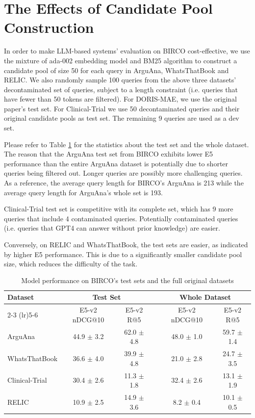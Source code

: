 \documentclass[11pt]{article}
\begin{document}
\section{The Effects of Candidate Pool Construction}
\label{sec: appendix_the effects of candidate pool construction}
In order to make LLM-based systems' evaluation on BIRCO cost-effective, we use the mixture of ada-002 embedding model and BM25 algorithm to construct a candidate pool of size 50 for each query in ArguAna, WhatsThatBook and RELIC. We also randomly sample 100 queries from the above three datasets' decontaminated set of queries, subject to a length constraint (i.e. queries that have fewer than 50 tokens are filtered). For DORIS-MAE, we use the original paper's test set. For Clinical-Trial we use 50 decontaminated queries and their original candidate pools as test set. The remaining 9 queries are used as a dev set.

Please refer to Table \ref{tab: test_set_whole_set_comparison} for the statistics about the test set and the whole dataset. The reason that the ArguAna test set from BIRCO exhibits lower E5 performance than the entire ArguAna dataset is potentially due to shorter queries being filtered out. Longer queries are possibly more challenging queries. As a reference, the average query length for BIRCO's ArguAna is 213 while the average query length for ArguAna's whole set is 193. 

Clinical-Trial test set is competitive with its complete set, which has 9 more queries that include 4 contaminated queries. Potentially contaminated queries (i.e. queries that GPT4 can answer without prior knowledge) are easier.

Conversely, on RELIC and WhatsThatBook, the test sets are easier, as indicated by higher E5 performance. This is due to a significantly smaller candidate pool size, which reduces the difficulty of the task. 



\begin{table}[ht]
\centering
\footnotesize
\setlength{\tabcolsep}{3pt}
\begin{tabular}{@{}lccccc@{}}
\toprule
Dataset & \multicolumn{2}{c}{Test Set} & \phantom{abc} & \multicolumn{2}{c}{Whole Dataset} \\
\cmidrule(lr){2-3} \cmidrule(lr){5-6}
& E5-v2 nDCG@10 & E5-v2 R@5 && E5-v2 nDCG@10 & E5-v2 R@5 \\
\midrule
ArguAna & 44.9  {$\pm$ 3.2} & 62.0  {$\pm$ 4.8} &&  48.0  {$\pm$ 1.0} & 59.7  {$\pm$ 1.4} \\
WhatsThatBook & 36.6  {$\pm$ 4.0} & 39.9  {$\pm$ 4.8} &&   21.0 {$\pm$ 2.8} & 24.7  {$\pm$ 3.5} \\
Clinical-Trial & 30.4 {$\pm$ 2.6}  & 11.3 {$\pm$ 1.8} && 32.4 {$\pm$ 2.6} & 13.1  {$\pm$ 1.9}\\
RELIC & 10.9 {$\pm$ 2.5} & 14.9  {$\pm$ 3.6} &&  8.2  {$\pm$ 0.4} & 10.1  {$\pm$ 0.5} \\
\bottomrule
\end{tabular}
\caption{Model performance on BIRCO's test sets and the full original datasets}
\label{tab: test_set_whole_set_comparison}
\end{table}
\end{document}
